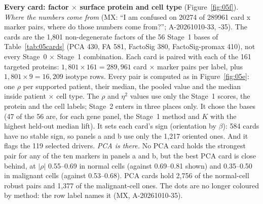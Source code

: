 \textbf{Every card: factor $\times$ surface protein and cell type} (Figure~\ref{fig:05f}). \emph{Where the numbers come from} (MX: ``I am confused on 20274 of 289961 card x marker pairs, where do those numbers come from?''; A-20261010-33, -35). The cards are the 1,801 non-degenerate factors of the 56 Stage~1 bases of Table~\ref{tab:05cards} (PCA 430, FA 581, FactoSig 380, FactoSig-promax 410), not every Stage~0 $\times$ Stage~1 combination. Each card is paired with each of the 161 targeted proteins: $1{,}801 \times 161 = 289{,}961$ card $\times$ marker pairs per label, plus $1{,}801 \times 9 = 16{,}209$ isotype rows. Every pair is computed as in Figure~\ref{fig:05e}: one $\rho$ per supported patient, their median, the pooled value and the median inside patient $\times$ cell type. The $\rho$ and $\eta^2$ values use only the Stage~1 scores, the protein and the cell labels; Stage~2 enters in three places only. It chose the bases (47 of the 56 are, for each gene panel, the Stage~1 method and $K$ with the highest held-out median lift). It sets each card's sign (orientation by $\beta$): 584 cards have no stable sign, so panels a and b use only the 1,217 oriented ones. And it flags the 119 selected drivers. \emph{PCA is there.} No PCA card holds the strongest pair for any of the ten markers in panels a and b, but the best PCA card is close behind, at $|\rho|$ 0.55--0.69 in normal cells (against 0.69--0.81 shown) and 0.35--0.50 in malignant cells (against 0.53--0.68). PCA cards hold 2,756 of the normal-cell robust pairs and 1,377 of the malignant-cell ones. The dots are no longer coloured by method: the row label names it (MX, A-20261010-35).

